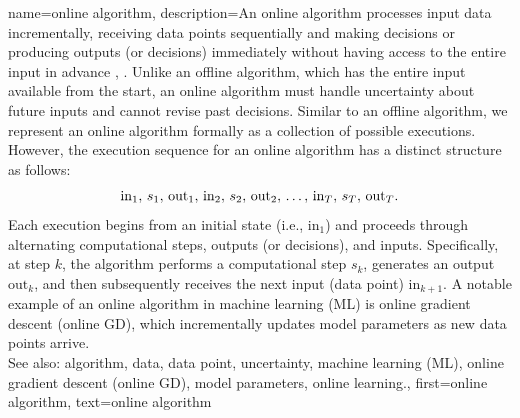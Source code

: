 {
{name={online algorithm},
	description={An online algorithm processes input data incrementally, 
		receiving data points sequentially and making decisions or producing outputs (or decisions) immediately 
		without having access to the entire input in advance \cite{PredictionLearningGames}, \cite{HazanOCO}. 
		Unlike an offline algorithm, which has the entire input available from the start, an online algorithm 
		must handle uncertainty about future inputs and cannot revise past decisions. Similar to an 
		offline algorithm, we represent an online algorithm formally as a collection of possible 
		executions. However, the execution sequence for an online algorithm has a distinct structure as follows:
		$${\rm in}_{1}, \,s_1, \,{\rm out}_{1}, \,{\rm in}_{2}, \,s_2, \,{\rm out}_{2}, \,\ldots, \,{\rm in}_{T}, \,s_T, \,{\rm out}_{T}.$$ 
		Each execution begins from an initial state (i.e., \(\text{in}_{1}\)) and proceeds through alternating 
		computational steps, outputs (or decisions), and inputs. Specifically, at step \(k\), 
		the algorithm performs a computational step \(s_{k}\), generates an output \(\text{out}_{k}\), 
		and then subsequently receives the next input (data point) \(\text{in}_{k+1}\). A 
		notable example of an online algorithm in machine learning (ML) is online gradient descent (online GD), which incrementally 
		updates model parameters as new data points arrive. 
					\\ 
		See also: algorithm, data, data point, uncertainty, machine learning (ML), online gradient descent (online GD), model parameters, online learning.},
	first={online algorithm},
	text={online algorithm} 
}


}
